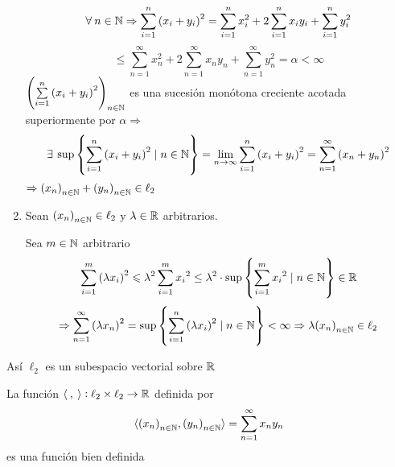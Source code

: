 \begin{proofexplanation}
\begin{enumerate}[label={\roman*})]
    \begin{equation*}
        \forall \: n \in \mathbb{N} \Rightarrow \sum\limits_{i=1}^{n} {({x}_{i}+{y}_{i})}^{2} =  \sum\limits_{i=1}^{n} {x}_{i}^{2} + 2  \sum\limits_{i=1}^{n} {x}_{i}{y}_{i} + \sum\limits_{i=1}^{n} {y}_{i}^{2}
    \end{equation*}
    \begin{equation*}
        \leqslant  \sum\limits_{n=1}^{\infty} {x}_{n}^{2} + 2  \sum\limits_{n=1}^{\infty} {x}_{n}{y}_{n} + \sum\limits_{n=1}^{\infty} {y}_{n}^{2} = \alpha
    < \infty
    \end{equation*}
    ${\left( \sum\limits_{i=1}^{n} {({x}_{i}+{y}_{i})}^{2} \right)}_{n \in \mathbb{N}}$ es una sucesión monótona creciente acotada superiormente por $\alpha \Rightarrow$
    \begin{equation*}
        \exists \: \sup \left\{ \sum\limits_{i=1}^{n}  {({x}_{i}+{y}_{i})}^{2} \mid n \in \N  \right\} = \lim\limits_{n\to\infty} \sum\limits_{i=1}^{n} {({x}_{i}+{y}_{i})}^{2} = \sum\limits_{n=1}^{\infty} {({x}_{n}+{y}_{n})}^{2}
    \end{equation*}
    $\Rightarrow  {({x}_{n})}_{n \in \mathbb{N}} +  {({y}_{n})}_{n \in \mathbb{N}} \in {\ell}_{2}$
    \item Sean ${({x}_{n})}_{n \in \mathbb{N}} \in {\ell}_{2}$ y $\lambda \in \mathbb{R}$ arbitrarios.

    Sea $m \in \mathbb{N}$ arbitrario
    \begin{equation*}
        \sum\limits_{i=1}^{m} {(\lambda {x}_{i})}^{2} \leqslant  \lambda^2 \sum\limits_{i=1}^{m} { {x}_{i}}^{2} \leq \lambda^2 \cdot \sup \left\{ \sum\limits_{i=1}^{m}  {{x}_{i}}^{2} \mid n \in \mathbb{N}  \right\} \in \mathbb{R}
    \end{equation*}
    \begin{equation*}
        \Rightarrow \sum\limits_{n=1}^{\infty} {(\lambda {x}_{n})}^{2} = \sup \left\{ \sum\limits_{i=1}^{n}  {(\lambda {x}_{i})}^{2} \mid n \in \mathbb{N}  \right\} < \infty \Rightarrow   \lambda {({x}_{n})}_{n \in \mathbb{N}}  \in {\ell}_{2}
    \end{equation*}
\end{enumerate}
Así $\ell_2$ es un subespacio vectorial sobre $\mathbb{R}$
\end{proofexplanation}

\begin{aff}
    La función $\langle \: , \: \rangle : \ell_2 \times \ell_2 \to \mathbb{R}$ definida por 
    \begin{equation*}
        \langle {({x}_{n})}_{n \in \mathbb{N}}, {({y}_{n})}_{n \in \mathbb{N}} \rangle = \sum\limits_{n=1}^{\infty} {x}_{n} {y}_{n}
    \end{equation*}
    es una función bien definida
\end{aff}


